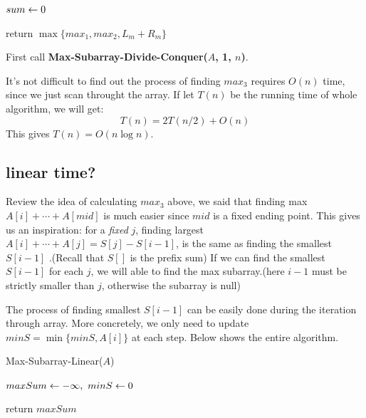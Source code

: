 \documentclass[11pt, a4paper]{COMP3711}
\begin{document}
\begin{spacing}{1.5}
\begin{algorithm}
        $sum\leftarrow 0$


        return $\max \{ max_1, max_2, L_m+R_m \}$
    \end{algorithm}

    First call {\bf Max-Subarray-Divide-Conquer($A$, 1, $n$)}.

    It's not difficult to find out the process of finding $max_3$
    requires $O(n)$ time, since we just scan throught the array.
    If let $T(n)$ be the running time of whole algorithm, 
    we will get:
    $$T(n)=2T(n/2)+O(n)$$
    This gives $T(n)=O(n\log n)$.

    \subsection{linear time?}

    Review the idea of calculating $max_3$ above, we said that 
    finding max $A[i]+\cdots +A[mid]$ is much easier since $mid$
    is a fixed ending point. This gives us an inspiration:
    for a {\it fixed} $j$, finding largest $A[i]+\cdots +A[j]=
    S[j]-S[i-1]$, is the same as finding the smallest $S[i-1]$
    .(Recall that $S[]$ is the prefix sum)
    If we can find the smallest $S[i-1]$ for each $j$,
    we will able to find the max subarray.(here $i-1$ must 
    be strictly smaller than $j$, otherwise the subarray is null)

    The process of finding smallest $S[i-1]$ can be easily done 
    during the iteration through array. More concretely, 
    we only need to update $minS = \min\{minS, A[i]\}$ at each step.
    Below shows the entire algorithm.
    
    \begin{algorithm}
        \caption{Max-Subarray-Linear($A$)}
        $maxSum \leftarrow -\infty,\ minS\leftarrow 0$

        return $maxSum$
    \end{algorithm}


\end{spacing}
\end{document}
